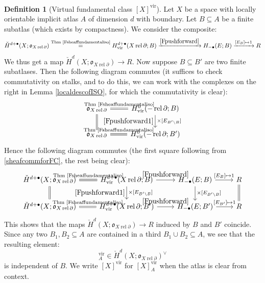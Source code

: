 \documentclass[12pt]{article}
\theoremstyle{definition}
\newtheorem{definition}[theorem]{Definition}
\theoremstyle{remark}
\numberwithin{equation}{subsection}
\newcommand{\oo}{\mathfrak o}
\newcommand{\cH}{\check H}
\newcommand{\vir}{\mathrm{vir}}
\newcommand{\rel}{\operatorname{rel}}
\begin{document}
\begin{definition}[{Virtual fundamental class $[X]^\vir$}]\label{fclassdefinition}
Let $X$ be a space with locally orientable implicit atlas $A$ of dimension $d$ with boundary.  Let $B\subseteq A$ be a finite subatlas (which exists by compactness).  We consider the composite:
\begin{equation}\label{Fpushforwardfundclassdef}
\cH^{d+\bullet}(X;\oo_{X\rel\partial})\overset{\text{Thm \ref{Fsheaffundamentaliso}}}=H^{d+\bullet}_\vir(X\rel\partial;B)\xrightarrow{\eqref{Fpushforward}}H_{-\bullet}(E;B)\xrightarrow{[E_B]\mapsto 1}R
\end{equation}
We thus get a map $\cH^d(X;\oo_{X\rel\partial})\to R$.  Now suppose $B\subseteq B'$ are two finite subatlases.  Then the following diagram commutes (it suffices to check commutativity on stalks, and to do this, we can work with the complexes on the right in Lemma \ref{localdescofISO}, for which the commutativity is clear):
\begin{equation}\label{sheafcommforFC}
\begin{tikzcd}
\oo_{X\rel\partial}\ar[equal]{r}{\text{Thm \ref{Fsheaffundamentaliso}}}\ar[equal]{d}&H^0_\vir(-\rel\partial;B)\ar{d}{\times[E_{B'\setminus B}]}[swap]{\eqref{Fpushforward1}}\\
\oo_{X\rel\partial}\ar[equal]{r}{\text{Thm \ref{Fsheaffundamentaliso}}}&H^0_\vir(-\rel\partial;B')
\end{tikzcd}
\end{equation}
Hence the following diagram commutes (the first square following from \eqref{sheafcommforFC}, the rest being clear):
\begin{equation}\label{Fpushforwardfundclassdefcommdiagram}
\begin{tikzcd}
\cH^{d+\bullet}(X;\oo_{X\rel\partial})\ar[equal]{r}{\text{Thm \ref{Fsheaffundamentaliso}}}\ar[equal]{d}&H^{d+\bullet}_\vir(X\rel\partial;B)\ar{r}{\eqref{Fpushforward}}\ar{d}{\times[E_{B'\setminus B}]}[swap]{\eqref{Fpushforward1}}&H_{-\bullet}(E;B)\ar{r}{[E_B]\mapsto 1}\ar{d}{\times[E_{B'\setminus B}]}&R\ar[equal]{d}\\
\cH^{d+\bullet}(X;\oo_{X\rel\partial})\ar[equal]{r}{\text{Thm \ref{Fsheaffundamentaliso}}}&H^{d+\bullet}_\vir(X\rel\partial;B')\ar{r}{\eqref{Fpushforward}}&H_{-\bullet}(E;B')\ar{r}{[E_{B'}]\mapsto 1}&R
\end{tikzcd}
\end{equation}
This shows that the maps $\cH^d(X;\oo_{X\rel\partial})\to R$ induced by $B$ and $B'$ coincide.  Since any two $B_1,B_2\subseteq A$ are contained in a third $B_1\cup B_2\subseteq A$, we see that the resulting element:
\begin{equation}
[X]^\vir_A\in\cH^d(X;\oo_{X\rel\partial})^\vee
\end{equation}
is independent of $B$.  We write $[X]^\vir$ for $[X]_A^\vir$ when the atlas is clear from context.
\end{definition}
\end{document}
